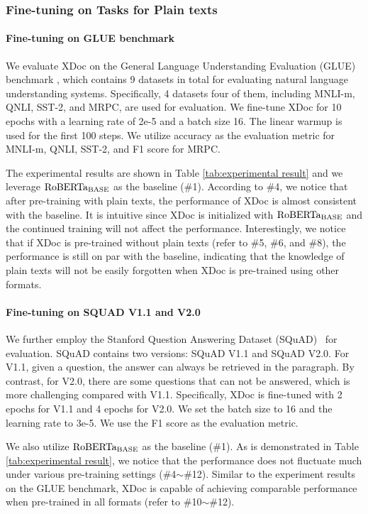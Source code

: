 \documentclass[11pt]{article}
\begin{document}
\subsubsection{Fine-tuning on Tasks for Plain texts}
\paragraph{Fine-tuning on GLUE benchmark}
We evaluate XDoc on the General Language Understanding Evaluation (GLUE) benchmark \cite{wang2018glue}, which contains 9 datasets in total for evaluating natural language understanding systems. Specifically, 4 datasets four of them, including MNLI-m, QNLI, SST-2, and MRPC, are used for evaluation. We fine-tune XDoc for 10 epochs with a learning rate of 2e-5 and a batch size 16. The linear warmup is used for the first 100 steps. We utilize accuracy as the evaluation metric for MNLI-m, QNLI, SST-2, and F1 score for MRPC.

The experimental results are shown in Table \ref{tab:experimental result} and we leverage ${\rm RoBERTa_{BASE}}$ \cite{liu2019roberta} as the baseline (\#1). According to \#4, we notice that after pre-training with plain texts, the performance of XDoc is almost consistent with the baseline. It is intuitive since XDoc is initialized with ${\rm RoBERTa_{BASE}}$ and the continued training will not affect the performance. Interestingly, we notice that if XDoc is pre-trained without plain texts (refer to \#5, \#6, and \#8), the performance is still on par with the baseline, indicating that the knowledge of plain texts will not be easily forgotten when XDoc is pre-trained using other formats.

\paragraph{Fine-tuning on SQUAD V1.1 and V2.0}
We further employ the Stanford Question Answering Dataset (SQuAD)~\cite{rajpurkar2016squad,rajpurkar2018know} for evaluation. SQuAD contains two versions: SQuAD V1.1 and SQuAD V2.0. For V1.1, given a question, the answer can always be retrieved in the paragraph. By contrast, for V2.0, there are some questions that can not be answered, which is more challenging compared with V1.1. Specifically, XDoc is fine-tuned with 2 epochs for V1.1 and 4 epochs for V2.0. We set the batch size to 16 and the learning rate to 3e-5. We use the F1 score as the evaluation metric.

We also utilize ${\rm RoBERTa_{BASE}}$ \cite{liu2019roberta} as the baseline (\#1). As is demonstrated in Table \ref{tab:experimental result}, we notice that the performance does not fluctuate much under various pre-training settings (\#4$\sim$\#12). Similar to the experiment results on the GLUE benchmark, XDoc is capable of achieving comparable performance when pre-trained in all formats (refer to \#10$\sim$\#12). 
\end{document}
